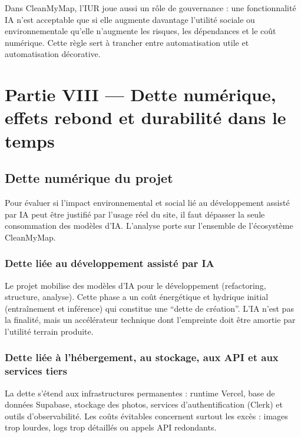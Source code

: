 \documentclass[
  10pt,
  a4paper,
  DIV=11,
  numbers=noendperiod,
  oneside]{scrreprt}
\begin{document}
Dans CleanMyMap, l'IUR joue aussi un rôle de gouvernance : une
fonctionnalité IA n'est acceptable que si elle augmente davantage
l'utilité sociale ou environnementale qu'elle n'augmente les risques,
les dépendances et le coût numérique. Cette règle sert à trancher entre
automatisation utile et automatisation décorative.

\newpage{}

\chapter{Partie VIII --- Dette numérique, effets rebond et durabilité
dans le
temps}\label{partie-viii-dette-numerique-effets-rebond-et-durabilite-dans-le-temps}

\section{Dette numérique du projet}\label{dette-numuxe9rique-du-projet}

Pour évaluer si l'impact environnemental et social lié au développement
assisté par IA peut être justifié par l'usage réel du site, il faut
dépasser la seule consommation des modèles d'IA. L'analyse porte sur
l'ensemble de l'écosystème CleanMyMap.

\subsection{Dette liée au développement assisté par
IA}\label{dette-liuxe9e-au-duxe9veloppement-assistuxe9-par-ia}

Le projet mobilise des modèles d'IA pour le développement (refactoring,
structure, analyse). Cette phase a un coût énergétique et hydrique
initial (entraînement et inférence) qui constitue une ``dette de
création''. L'IA n'est pas la finalité, mais un accélérateur technique
dont l'empreinte doit être amortie par l'utilité terrain produite.

\subsection{Dette liée à l'hébergement, au stockage, aux API et aux
services
tiers}\label{dette-liuxe9e-uxe0-lhuxe9bergement-au-stockage-aux-api-et-aux-services-tiers}

La dette s'étend aux infrastructures permanentes : runtime Vercel, base
de données Supabase, stockage des photos, services d'authentification
(Clerk) et outils d'observabilité. Les coûts évitables concernent
surtout les excès : images trop lourdes, logs trop détaillés ou appels
API redondants.
\end{document}
